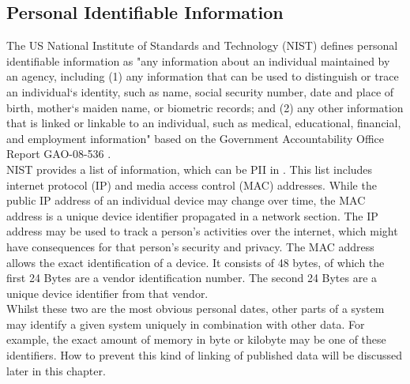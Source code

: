     \subsection{Personal Identifiable Information}
        \label{subsec:related:pii}
        
        The US National Institute of Standards and Technology (NIST) defines personal identifiable information as "any information about an individual maintained by an agency, including (1) any information that can be used to distinguish or trace an individual‘s identity, such as name, social security number, date and place of birth, mother‘s maiden name, or biometric records; and (2) any other information that is linked or linkable to an individual, such as medical, educational, financial, and employment information"  \cite{mccallister_guide_2010} based on the Government Accountability Office Report GAO-08-536  \cite{government_accountability_office_privacy_2008}.\\
        NIST provides a list of information, which can be PII in   \cite{mccallister_guide_2010}. This list includes internet protocol (IP) and media access control (MAC) addresses. While the public IP address of an individual device may change over time, the MAC address is a unique device identifier propagated in a network section.
        The IP address may be used to track a person's activities over the internet, which might have consequences for that person's security and privacy. 
        The MAC address allows the exact identification of a device. It consists of 48 bytes, of which the first 24 Bytes are a vendor identification number. The second 24 Bytes are a unique device identifier from that vendor.\\
        Whilst these two are the most obvious personal dates, other parts of a system may identify 
        a given system uniquely in combination with other data. For example, the exact amount of memory in byte or kilobyte may be one of these identifiers. How to prevent this kind of linking of published data will be discussed later in this chapter.\\
        
